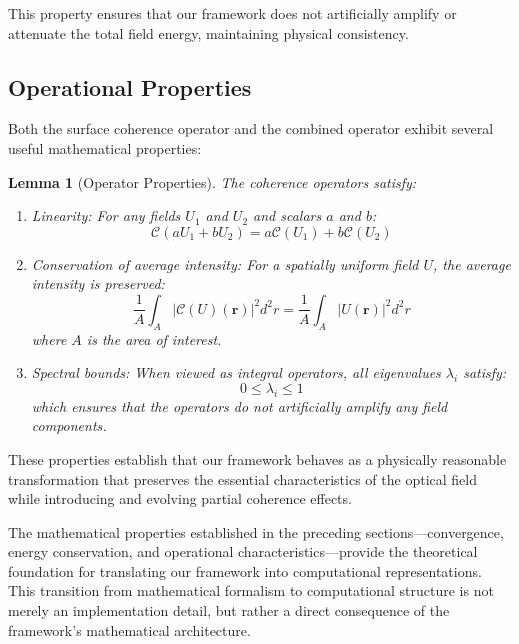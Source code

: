 \documentclass[a4paper,12pt]{article}
\newtheorem{lemma}[theorem]{Lemma}
\begin{document}
This property ensures that our framework does not artificially amplify or attenuate the total field energy, maintaining physical consistency.

\subsection{Operational Properties}

Both the surface coherence operator and the combined operator exhibit several useful mathematical properties:

\begin{lemma}[Operator Properties] \label{lem:properties}
The coherence operators satisfy:
\begin{enumerate}
\item Linearity: For any fields $U_1$ and $U_2$ and scalars $a$ and $b$:
\begin{equation}
\mathcal{C}(aU_1 + bU_2) = a\mathcal{C}(U_1) + b\mathcal{C}(U_2)
\end{equation}

\item Conservation of average intensity: For a spatially uniform field $U$, the average intensity is preserved:
\begin{equation}
\frac{1}{A}\int_A |\mathcal{C}(U)(\bm{r})|^2 d^2r = \frac{1}{A}\int_A |U(\bm{r})|^2 d^2r
\end{equation}
where $A$ is the area of interest.

\item Spectral bounds: When viewed as integral operators, all eigenvalues $\lambda_i$ satisfy:
\begin{equation}
0 \leq \lambda_i \leq 1
\end{equation}
which ensures that the operators do not artificially amplify any field components.
\end{enumerate}
\end{lemma}

These properties establish that our framework behaves as a physically reasonable transformation that preserves the essential characteristics of the optical field while introducing and evolving partial coherence effects.


The mathematical properties established in the preceding sections—convergence, energy conservation, and operational characteristics—provide the theoretical foundation for translating our framework into computational representations. This transition from mathematical formalism to computational structure is not merely an implementation detail, but rather a direct consequence of the framework's mathematical architecture.
\end{document}
